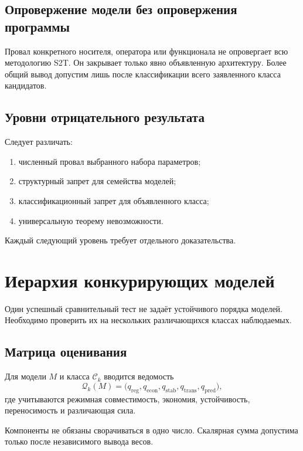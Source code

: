 \section{Опровержение модели без опровержения программы}

Провал конкретного носителя, оператора или функционала не опровергает всю
методологию S2T. Он закрывает только явно объявленную архитектуру. Более общий
вывод допустим лишь после классификации всего заявленного класса кандидатов.

\section{Уровни отрицательного результата}

Следует различать:
\begin{enumerate}
 \item численный провал выбранного набора параметров;
 \item структурный запрет для семейства моделей;
 \item классификационный запрет для объявленного класса;
 \item универсальную теорему невозможности.
\end{enumerate}

Каждый следующий уровень требует отдельного доказательства.

\chapter{Иерархия конкурирующих моделей}

Один успешный сравнительный тест не задаёт устойчивого порядка моделей.
Необходимо проверить их на нескольких различающихся классах наблюдаемых.

\section{Матрица оценивания}

Для модели $M$ и класса $\mathcal C_k$ вводится ведомость
\begin{equation}
 \mathcal Q_k(M)=
 \bigl(q_{\mathrm{reg}},q_{\mathrm{econ}},q_{\mathrm{stab}},
 q_{\mathrm{trans}},q_{\mathrm{pred}}\bigr),
\end{equation}
где учитываются режимная совместимость, экономия, устойчивость,
переносимость и различающая сила.

Компоненты не обязаны сворачиваться в одно число. Скалярная сумма допустима
только после независимого вывода весов.

